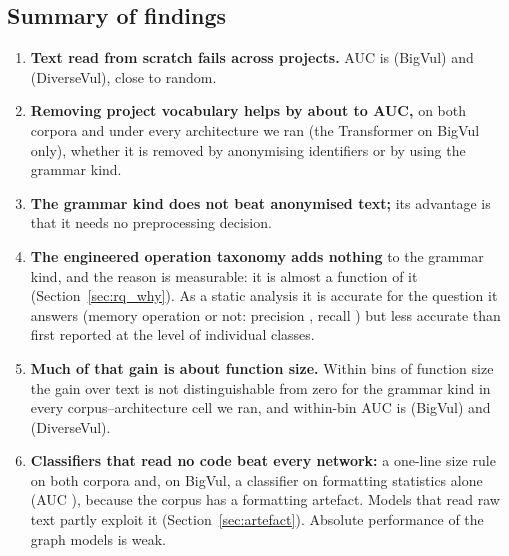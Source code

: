 \subsection{Summary of findings}
\label{sec:summary}

\begin{enumerate}
    \item \textbf{Text read from scratch fails across projects.} AUC is
          \mBvGgnnLexAuc{} (BigVul) and \mDvGgnnLexAuc{} (DiverseVul), close to
          random.
    \item \textbf{Removing project vocabulary helps by about \numdeltaMin{} to \numdeltaMax{} AUC,}
          on both corpora and under every architecture we ran (the Transformer on
          BigVul only), whether it is removed
          by anonymising identifiers or by using the grammar kind.
    \item \textbf{The grammar kind does not beat anonymised text;} its advantage
          is that it needs no preprocessing decision.
    \item \textbf{The engineered operation taxonomy adds nothing} to the grammar
          kind, and the reason is measurable: it is almost a function of it
          (Section~\ref{sec:rq_why}). As a static analysis it is accurate for the
          question it answers (memory operation or not: precision
          \numpooledMemopP{}, recall \numpooledMemopR{}) but less accurate than
          first reported at the level of individual classes.
    \item \textbf{Much of that gain is about function size.} Within bins of
          function size the gain over text is not distinguishable from zero for
          the grammar kind in every corpus--architecture cell we ran, and within-bin AUC is \mBvGgnnKindSs{} (BigVul) and
          \mDvGgnnKindSs{} (DiverseVul).
    \item \textbf{Classifiers that read no code beat every network:} a
          one-line size rule on both corpora and, on BigVul, a classifier on
          formatting statistics alone (AUC \rBvFormatAuc{}), because the corpus
          has a formatting artefact. Models that read raw text partly exploit
          it (Section~\ref{sec:artefact}). Absolute performance of the graph
          models is weak.
\end{enumerate}
